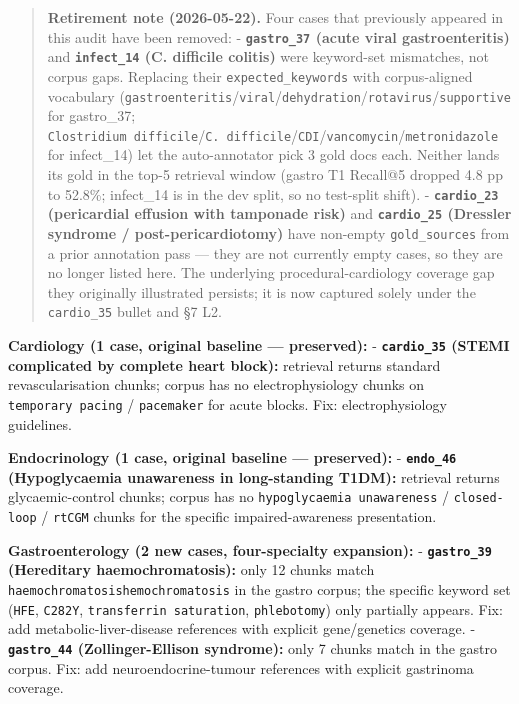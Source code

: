 \documentclass[
  american,
  a4paper,
]{article}
\begin{document}
\begin{quote}
\textbf{Retirement note (2026-05-22).} Four cases that previously
appeared in this audit have been removed: - \textbf{\texttt{gastro\_37}
(acute viral gastroenteritis)} and \textbf{\texttt{infect\_14} (C.
difficile colitis)} were keyword-set mismatches, not corpus gaps.
Replacing their \texttt{expected\_keywords} with corpus-aligned
vocabulary
(\texttt{gastroenteritis}/\texttt{viral}/\texttt{dehydration}/\texttt{rotavirus}/\texttt{supportive}
for gastro\_37;
\texttt{Clostridium\ difficile}/\texttt{C.\ difficile}/\texttt{CDI}/\texttt{vancomycin}/\texttt{metronidazole}
for infect\_14) let the auto-annotator pick 3 gold docs each. Neither
lands its gold in the top-5 retrieval window (gastro T1 Recall@5 dropped
4.8 pp to 52.8\%; infect\_14 is in the dev split, so no test-split
shift). - \textbf{\texttt{cardio\_23} (pericardial effusion with
tamponade risk)} and \textbf{\texttt{cardio\_25} (Dressler syndrome /
post-pericardiotomy)} have non-empty \texttt{gold\_sources} from a prior
annotation pass --- they are not currently empty cases, so they are no
longer listed here. The underlying procedural-cardiology coverage gap
they originally illustrated persists; it is now captured solely under
the \texttt{cardio\_35} bullet and §7 L2.
\end{quote}

\textbf{Cardiology (1 case, original baseline --- preserved):} -
\textbf{\texttt{cardio\_35} (STEMI complicated by complete heart
block):} retrieval returns standard revascularisation chunks; corpus has
no electrophysiology chunks on \texttt{temporary\ pacing} /
\texttt{pacemaker} for acute blocks. Fix: electrophysiology guidelines.

\textbf{Endocrinology (1 case, original baseline --- preserved):} -
\textbf{\texttt{endo\_46} (Hypoglycaemia unawareness in long-standing
T1DM):} retrieval returns glycaemic-control chunks; corpus has no
\texttt{hypoglycaemia\ unawareness} / \texttt{closed-loop} /
\texttt{rtCGM} chunks for the specific impaired-awareness presentation.

\textbf{Gastroenterology (2 new cases, four-specialty expansion):} -
\textbf{\texttt{gastro\_39} (Hereditary haemochromatosis):} only 12
chunks match \texttt{haemochromatosis\textbar{}hemochromatosis} in the
gastro corpus; the specific keyword set (\texttt{HFE}, \texttt{C282Y},
\texttt{transferrin\ saturation}, \texttt{phlebotomy}) only partially
appears. Fix: add metabolic-liver-disease references with explicit
gene/genetics coverage. - \textbf{\texttt{gastro\_44} (Zollinger-Ellison
syndrome):} only 7 chunks match in the gastro corpus. Fix: add
neuroendocrine-tumour references with explicit gastrinoma coverage.
\end{document}
